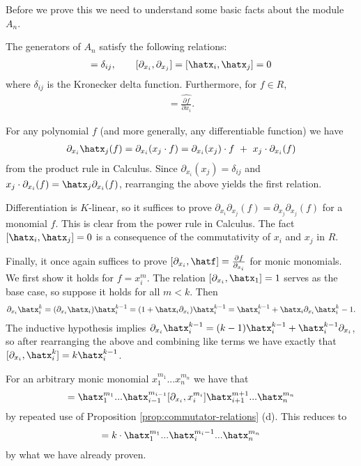 \noindent Before we prove this we need to understand some basic facts about the module $A_n$.

\begin{lem}\label{lem:Weyl-algebra-relations}
	The generators of $A_n$ satisfy the following relations:
	\begin{align*}
		[\partial_{x_i},\hatx_j] = \delta_{ij}, \hspace{2em} [\partial_{x_i}, \partial_{x_j}] = [\hatx_i,\hatx_j] = 0
	\end{align*}
	where $\delta_{ij}$ is the Kronecker delta function. Furthermore, for $f \in R$,
	\begin{align*}
		[\partial_{x_i}, \hatf] = \widehat{\frac{\partial f}{\partial x_i}}.
	\end{align*}
\end{lem}
\begin{prf}
	For any polynomial $f$ (and more generally, any differentiable function) we have
	\begin{align*}
		\partial_{x_i}\hatx_j(f) = \partial_{x_i}(x_j\cdot f) = \partial_{x_i}(x_j) \cdot f ~+~ x_j \cdot \partial_{x_i}(f)
	\end{align*}
	from the product rule in Calculus. Since $\partial_{x_i}(x_j) = \delta_{ij}$ and $x_j\cdot \partial_{x_i}(f) = \hatx_j\partial_{x_i}(f)$, rearranging the above yields the first relation.

	Differentiation is $K$-linear, so it suffices to prove $\partial_{x_i}\partial_{x_j}(f) = \partial_{x_j}\partial_{x_j}(f)$ for a monomial $f$. This is clear from the power rule in Calculus. The fact $[\hatx_i,\hatx_j] = 0$ is a consequence of the commutativity of $x_i$ and $x_j$ in $R$.

	Finally, it once again suffices to prove $[\partial_{x_i},\hatf] = \frac{\partial f}{\partial_{x_i}}$ for monic monomials. We first show it holds for $f = x_i^m$. The relation $[\partial_{x_i}, \hatx_1] = 1$ serves as the base case, so suppose it holds for all $m < k$. Then
	\begin{align*}
		\partial_{x_i}\hatx_i^k = (\partial_{x_i}\hatx_i)\hatx_i^{k-1} = (1+\hatx_i\partial_{x_i})\hatx_i^{k-1} = \hatx_i^{k-1} + \hatx_i\partial_{x_i}\hatx_i^k-1.
	\end{align*}
	The inductive hypothesis implies $\partial_{x_i}\hatx_i^{k-1} = (k-1)\hatx_i^{k-1} + \hatx_i^{k-1}\partial_{x_i}$, so after rearranging the above and combining like terms we have exactly that $[\partial_{x_i}, \hatx_i^k] = k\hatx_i^{k-1}$.

	For an arbitrary monic monomial $x_1^{m_1}...x_n^{m_n}$ we have that
	\begin{align*}
		[\partial_{x_i}, \hatx_1^{m_1}...\hatx_n^{m_n}] = \hatx_1^{m_1}...\hatx_{i-1}^{m_{i-1}}[\partial_{x_i}, x_i^{m_i}]\hatx_{i+1}^{m+1}...\hatx_{n}^{m_n}
	\end{align*}
	by repeated use of Proposition \ref{prop:commutator-relations} (d). This reduces to
	\begin{align*}
		[\partial_{x_i}, \hatx_1^{m_1}...\hatx_n^{m_n}] = k\cdot \hatx_{1}^{m_1}...\hatx_i^{m_i - 1}...\hatx_n^{m_n}
	\end{align*}
	by what we have already proven. 
\end{prf}
